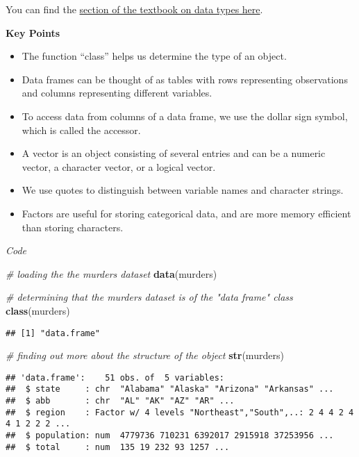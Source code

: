 \documentclass[]{article}
\newenvironment{Shaded}{\begin{snugshade}}{\end{snugshade}}
\newcommand{\CommentTok}[1]{\textcolor[rgb]{0.56,0.35,0.01}{\textit{#1}}}
\newcommand{\KeywordTok}[1]{\textcolor[rgb]{0.13,0.29,0.53}{\textbf{#1}}}
\newcommand{\NormalTok}[1]{#1}
\providecommand{\tightlist}{%
  \setlength{\itemsep}{0pt}\setlength{\parskip}{0pt}}
\begin{document}
You can find the
\href{https://rafalab.github.io/dsbook/r-basics.html\#data-types}{section
of the textbook on data types here}.

\textbf{Key Points}

\begin{itemize}
\tightlist
\item
  The function ``class'' helps us determine the type of an object.
\item
  Data frames can be thought of as tables with rows representing
  observations and columns representing different variables.
\item
  To access data from columns of a data frame, we use the dollar sign
  symbol, which is called the accessor.
\item
  A vector is an object consisting of several entries and can be a
  numeric vector, a character vector, or a logical vector.
\item
  We use quotes to distinguish between variable names and character
  strings.
\item
  Factors are useful for storing categorical data, and are more memory
  efficient than storing characters.
\end{itemize}

\emph{Code}

\begin{Shaded}
\begin{Highlighting}[]
\CommentTok{# loading the the murders dataset}
\KeywordTok{data}\NormalTok{(murders)}

\CommentTok{# determining that the murders dataset is of the "data frame" class}
\KeywordTok{class}\NormalTok{(murders)}
\end{Highlighting}
\end{Shaded}

\begin{verbatim}
## [1] "data.frame"
\end{verbatim}

\begin{Shaded}
\begin{Highlighting}[]
\CommentTok{# finding out more about the structure of the object}
\KeywordTok{str}\NormalTok{(murders)}
\end{Highlighting}
\end{Shaded}

\begin{verbatim}
## 'data.frame':    51 obs. of  5 variables:
##  $ state     : chr  "Alabama" "Alaska" "Arizona" "Arkansas" ...
##  $ abb       : chr  "AL" "AK" "AZ" "AR" ...
##  $ region    : Factor w/ 4 levels "Northeast","South",..: 2 4 4 2 4 4 1 2 2 2 ...
##  $ population: num  4779736 710231 6392017 2915918 37253956 ...
##  $ total     : num  135 19 232 93 1257 ...
\end{verbatim}
\end{document}
